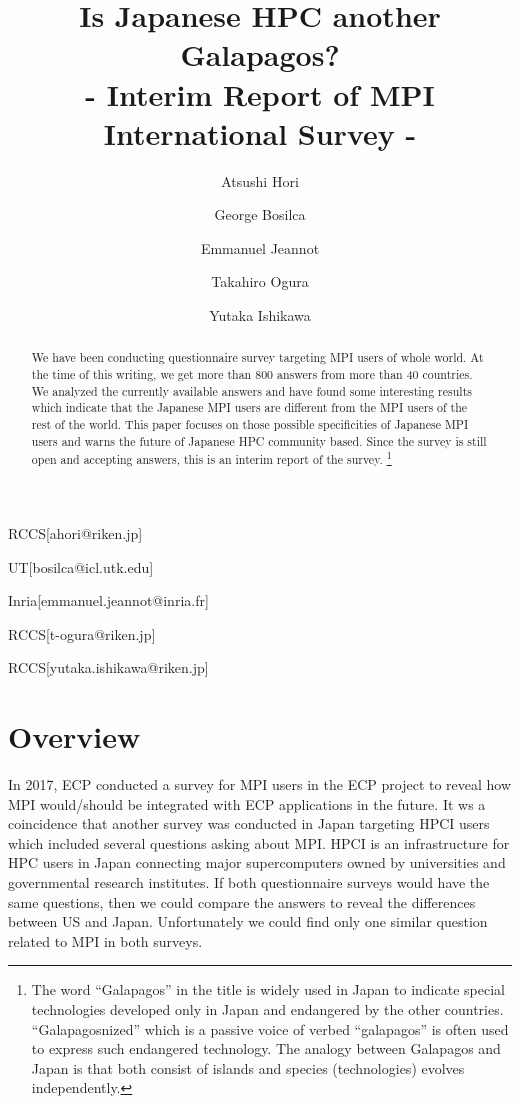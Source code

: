 \documentclass[submit,techrep,noauthor,english]{ipsj}
\begin{document}
\title{Is Japanese HPC another Galapagos?\\
- Interim Report of MPI International Survey -}


\author{Atsushi Hori}{RCCS}[ahori@riken.jp]
\author{George Bosilca}{UT}[bosilca@icl.utk.edu]
\author{Emmanuel Jeannot}{Inria}[emmanuel.jeannot@inria.fr]
\author{Takahiro Ogura}{RCCS}[t-ogura@riken.jp]
\author{Yutaka Ishikawa}{RCCS}[yutaka.ishikawa@riken.jp]

\begin{abstract}
We have been conducting questionnaire survey targeting MPI users of
whole world.  At the time of this writing, we get more than 800
answers from more than 40 countries.
We analyzed the currently available answers and have found some
interesting results which indicate that the Japanese MPI users are
different from the MPI users of the rest of the world. This paper focuses
on those possible specificities of Japanese MPI users and warns
the future of Japanese HPC community based. Since the survey is still
open and accepting answers, this is an interim report of the survey.
\footnote{The word ``Galapagos'' in the title is widely used in Japan to
indicate special technologies developed only in Japan and endangered
by the other countries.  ``Galapagosnized'' which is a passive voice of
verbed ``galapagos'' is often used to express such endangered
technology.  The analogy between Galapagos and Japan is
that both consist of islands and species (technologies) evolves
independently.}
\end{abstract}

\maketitle

\section{Overview}

In 2017, ECP\cite{ECP} conducted a survey for MPI users in the ECP
project to reveal how MPI would/should be integrated with ECP
applications in the future\cite{osti_1462877}.  It ws a coincidence
that another survey was conducted in Japan targeting HPCI\cite{HPCI}
users which included several questions asking about
MPI\cite{hpci-user-survey}.  HPCI is an infrastructure for HPC users
in Japan connecting major supercomputers owned by universities and
governmental research institutes. If both questionnaire surveys would
have the same questions, then we could compare the answers to reveal
the differences between US and Japan. Unfortunately we could find only
one similar question related to MPI in both surveys.
\end{document}
